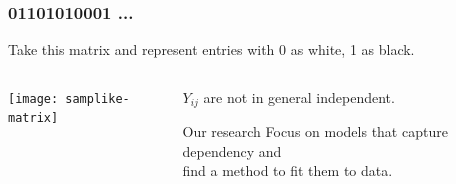 \documentclass[ 10pt]{beamer}
\begin{document}
%
%
%
%
%

\frame
{
\frametitle{01101010001 ...}
Take this matrix and represent entries with 0 as white, 1 as black.
\begin{columns}[T]
\begin{column}[T]{0.35\textwidth}
\texttt{[image: samplike-matrix]}
\end{column}
\pause
\begin{column}[T]{0.65\textwidth}
\vspace{5mm}

$Y_{ij}$ are \alert{not} in general independent.
\vspace{2mm}

\begin{block}{Our research}
Focus on models that capture dependency and \\
find a method to fit them to data.
\end{block}

\end{column}
\end{columns}





}
\end{document}
